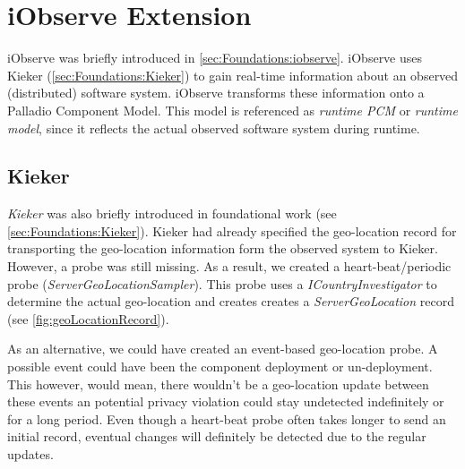 
\chapter{iObserve Extension}
\label{ch:iObserve}

iObserve was briefly introduced in \autoref{sec:Foundations:iobserve}. iObserve uses Kieker (\autoref{sec:Foundations:Kieker}) to gain real-time information about an observed (distributed) software system. iObserve transforms these information onto a Palladio Component Model. This model is referenced as \textit{runtime PCM} or \textit{runtime model}, since it reflects the actual observed software system during runtime. \cite{Heinrich.2016}


\section{Kieker}
\label{sec:Kieker:privacy}

\textit{Kieker} was also briefly introduced in foundational work (see \autoref{sec:Foundations:Kieker}). Kieker had already specified the geo-location record for transporting the geo-location information form the observed system to Kieker. However, a probe was still missing. As a result, we created a heart-beat/periodic probe (\textit{ServerGeoLocationSampler}). This probe uses a \textit{ICountryInvestigator} to determine the actual geo-location and creates creates a \textit{ServerGeoLocation} record (see \autoref{fig:geoLocationRecord}).

As an alternative, we could have created an event-based geo-location probe. A possible event could have been the component deployment or un-deployment. This however, would mean, there wouldn't be a geo-location update between these events an potential privacy violation could stay undetected indefinitely or for a long period. Even though a heart-beat probe often takes longer to send an initial record, eventual changes will definitely be detected due to the regular updates.

